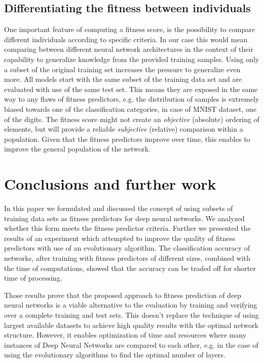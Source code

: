 \documentclass{llncs}
\begin{document}
\subsection{Differentiating the fitness between individuals}

One important feature of computing a fitness score, is the possibility to compare different individuals according to specific criteria. In our case this would mean comparing between different neural network architectures in the context of their capability to generalize knowledge from the provided training samples. Using only a subset of the original training set increases the pressure to generalize even more. All models start with the same subset of the training data set and are evaluated with use of the same test set. This means they are exposed in the same way to any flaws of fitness predictors, e.g. the distribution of samples is extremely biased towards one of the classification categories, in case of MNIST dataset, one of the digits. The fitness score might not create an \emph{objective} (absolute) ordering of elements, but will provide a reliable \emph{subjective} (relative) comparison within a population. Given that the fitness predictors improve over time, this enables to improve the general population of the network. 

\section{Conclusions and further work}

In this paper we formulated and discussed the concept of using subsets of training data sets as fitness predictors for deep neural networks. We analyzed whether this form meets the fitness predictor criteria. Further we presented the results of an experiment which attempted to improve the quality of fitness predictors with use of an evolutionary algorithm. The classification accuracy of networks, after training with fitness predictors of different sizes, combined with the time of computations, showed that the accuracy can be traded off for shorter time of processing.

Those results prove that the proposed approach to fitness prediction of deep neural networks is a viable alternative to the evaluation by training and verifying over a complete training and test sets. This doesn't replace the technique of using largest available datasets to achieve high quality results with the optimal network structure. However, it enables optimization of time and resources where many instances of Deep Neural Networks are compared to each other, e.g. in the case of using the evolutionary algorithms to find the optimal number of layers.
\end{document}

